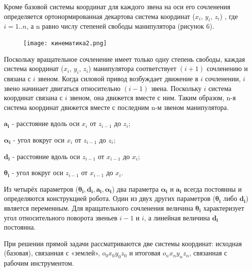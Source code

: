 Кроме базовой системы координат для каждого звена на оси его сочленения определяется ортонормированная декартова система координат ($x_i$, $y_i$, $z_i$) , где $i=1..n$, а n равно числу степеней свободы
манипулятора (рисунок 6)\cite{litlink11}. 


\begin{figure}[!h]
\begin{center}
\texttt{[image: кинематика2.png]}
\caption{\centering {}}
\label{БТС}
\end{center}
\end{figure}

Поскольку вращательное сочленение имеет только одну степень свободы, каждая система координат ($x_i$, $y_i$, $z_i$) манипулятора соответствует $(i+1)$ сочленению и связана с $i$ звеном. Когда силовой привод возбуждает движение в $i$ сочленении, $i$ звено начинает двигаться относительно $(i-1)$ звена. Поскольку $i$  система координат связана с $i$  звеном, она движется вместе с ним. Таким образом, n-я система координат движется вместе с последним n-м звеном манипулятора.

$\boldsymbol{a}_{\boldsymbol{i}}$ - расстояние вдоль оси $x_{i}$ от $z_{i-1}$ до $z_{i}$;

$\boldsymbol{\alpha}_{\boldsymbol{i}}$ - угол вокруг оси $x_{i}$ от $z_{i-1}$ до $z_{i}$;

$\boldsymbol{d}_{\boldsymbol{i}}$ -  расстояние вдоль оси $z_{i-1}$ от $x_{i-1}$ до $x_{i}$;

$\boldsymbol{\theta}_{\boldsymbol{i}}$ - угол вокруг оси $z_{i-1}$ от $x_{i-1}$ до $x_{i}$.

Из четырёх параметров ($\boldsymbol{\theta}_{\boldsymbol{i}}, \boldsymbol{d}_{\boldsymbol{i}}, \boldsymbol{a}_{\boldsymbol{i}}, \boldsymbol{\alpha}_{\boldsymbol{i}}$) два параметра $\boldsymbol{\alpha}_{\boldsymbol{i}}$ и $\boldsymbol{a}_{\boldsymbol{i}}$  всегда  постоянны и  определяются  конструкцией  робота.  Один  из  двух  других параметров ($\boldsymbol{\theta}_{\boldsymbol{i}}$ либо $\boldsymbol{d}_{\boldsymbol{i}}$)  является  переменным.  Для вращательного  сочленения  величина $\boldsymbol{\theta}_{\boldsymbol{i}}$ характеризует  угол  относительного  поворота  звеньев  $i-1$  и  $i$,  а  линейная  величина $\boldsymbol{d}_{\boldsymbol{i}}$ постоянна. 

При решении прямой задачи рассматриваются две системы координат: исходная (базовая), связанная с «землей»,
$o_{0} x_{0} y_{0} z_{0}$ и итоговая $o_{n} x_{n} y_{n} z_{n}$, связанная с рабочим инструментом.

